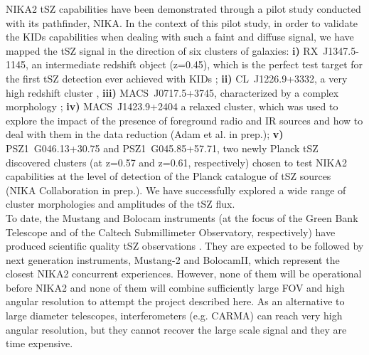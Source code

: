 \documentclass[11pt,a4paper,twoside,graphicx,color]{article}
\begin{document}
NIKA2 tSZ capabilities have been demonstrated through a pilot study conducted with its pathfinder, NIKA. In the context of this pilot study, in order to validate the KIDs capabilities when dealing with such a faint and diffuse signal, we have mapped the tSZ signal in the direction of six clusters of galaxies:  
{\bf i)} RX~J1347.5-1145, an intermediate redshift object (z=0.45), which is the perfect test target for the first tSZ detection ever achieved with KIDs \citep{Adam2014}; {\bf ii)} CL~J1226.9+3332, a very high redshift cluster \citep[z~$=$~0.89, ][the tSZ map at 150~GHz is shown in the left panel of Fig. \ref{Fig:CL_and_sample}]{Adam2015}, {\bf iii)} MACS~J0717.5+3745, characterized by a complex morphology \citep{Moriond2014}; {\bf iv)} MACS~J1423.9+2404 a relaxed cluster, which was used to explore the impact of the presence of foreground radio and IR sources and how to deal with them in the data reduction (Adam et al. in prep.); {\bf v)} PSZ1~G046.13+30.75 and PSZ1~G045.85+57.71, two newly Planck tSZ discovered clusters (at z=0.57 and z=0.61, respectively) chosen to test NIKA2 capabilities at the level of detection of the Planck catalogue of tSZ sources (NIKA Collaboration in prep.). We have successfully explored a wide range of cluster morphologies and amplitudes of the tSZ flux. \\
To date, the Mustang and Bolocam instruments (at the focus of the Green Bank Telescope and of the Caltech Submillimeter Observatory, respectively) have produced scientific quality tSZ observations \citep{Korngut2011, Mroczkowski2012, Young2014, Sayers2011, Sayers2013, Czakon2014}. They are expected to be followed by next generation instruments, Mustang-2 and BolocamII, which represent the closest NIKA2 concurrent experiences. However, none of them will be operational before NIKA2 and none of them will combine sufficiently large FOV and high angular resolution to attempt the project described here. As an alternative to large diameter telescopes, interferometers (e.g. CARMA) can reach very high angular resolution, but they cannot recover the large scale signal and they are time expensive. 
\end{document}

